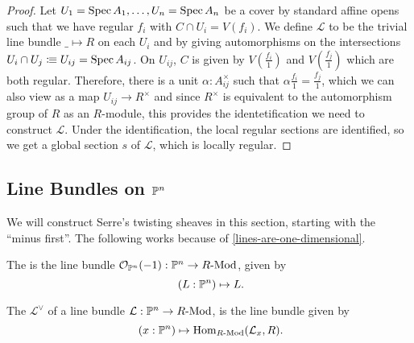\begin{proof}
  Let $U_1=\operatorname{Spec} A_1,\dots,U_n=\operatorname{Spec} A_n$ be a cover by standard  affine opens such that we have
  regular $f_i$ with $C\cap U_i=V(f_i)$. 
  We define $\mathcal L$ to be the trivial line bundle $\_\mapsto R$ on each $U_i$
  and by giving automorphisms on the intersections $U_i\cap U_j\vcentcolon\mspace{-1.2mu}\equiv U_{ij}=\operatorname{Spec} A_{ij}$.
  On $U_{ij}$, $C$ is given by $V(\frac{f_i}{1})$ and $V(\frac{f_j}{1})$ which are both regular.
  Therefore, there is a unit $\alpha:A_{ij}^\times$ such that $\alpha\frac{f_i}{1}=\frac{f_j}{1}$,
  which we can also view as a map $U_{ij}\to R^\times$ and since $R^\times$
  is equivalent to the automorphism group of $R$ as an $R$-module,
  this provides the identetification we need to construct $\mathcal L$.
  Under the identification, the local regular sections are identified, so we get a global section $s$ of $\mathcal L$,
  which is locally regular.
\end{proof}

\subsection{Line Bundles on $\mathbb{P}^n$}

We will construct Serre's twisting sheaves in this section,
starting with the ``minus first''.
The following works because of \cref{lines-are-one-dimensional}.

\begin{definition}
  The  is the line bundle $\mathcal O_{\mathbb{P}^n}(-1):\mathbb{P}^n\to R\text{-}\mathrm{Mod}$,
  given by
  \[ (L:\bP^n)\mapsto L\rlap{.}\]
\end{definition}

\begin{definition}
  The  $\mathcal L^\vee$ of a line bundle $\mathcal L:\mathbb{P}^n\to R\text{-}\mathrm{Mod}$,
  is the line bundle given by
  \[ (x:\bP^n)\mapsto \Hom_{\Mod{R}}(\mathcal L_x,R)\rlap{.}\]
\end{definition}
